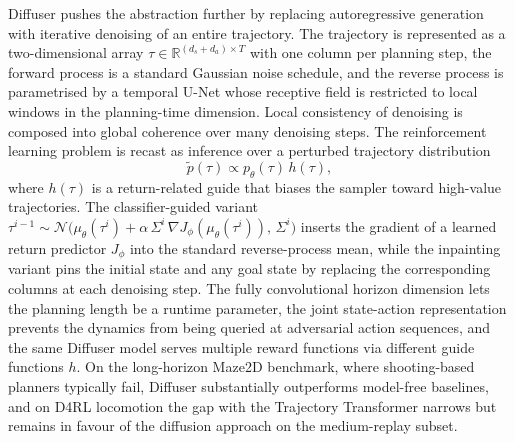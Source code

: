 Diffuser \citep{Janner2022diffuser} pushes the abstraction further by replacing
autoregressive generation with iterative denoising of an entire trajectory. The
trajectory is represented as a two-dimensional array
$\tau \in \mathbb R^{(d_s + d_a) \times T}$ with one column per planning step, the
forward process is a standard Gaussian noise schedule, and the reverse process is
parametrised by a temporal U-Net whose receptive field is restricted to local
windows in the planning-time dimension. Local consistency of denoising is composed
into global coherence over many denoising steps. The reinforcement learning problem
is recast as inference over a perturbed trajectory distribution
\begin{equation}
\tilde p(\tau) \propto p_\theta(\tau)\, h(\tau),
\label{eq:diffuser_perturbed}
\end{equation}
where $h(\tau)$ is a return-related guide that biases the sampler toward
high-value trajectories. The classifier-guided variant
$\tau^{i-1} \sim \mathcal N\bigl( \mu_\theta(\tau^i) + \alpha\, \Sigma^i\,
\nabla J_\phi(\mu_\theta(\tau^i)),\, \Sigma^i \bigr)$
inserts the gradient of a learned return predictor $J_\phi$ into the standard
reverse-process mean, while the inpainting variant pins the initial state and any
goal state by replacing the corresponding columns at each denoising step. The
fully convolutional horizon dimension lets the planning length be a runtime
parameter, the joint state-action representation prevents the dynamics from being
queried at adversarial action sequences, and the same Diffuser model serves
multiple reward functions via different guide functions $h$. On the long-horizon
Maze2D benchmark, where shooting-based planners typically fail, Diffuser
substantially outperforms model-free baselines, and on D4RL locomotion the gap
with the Trajectory Transformer narrows but remains in favour of the diffusion
approach on the medium-replay subset.

